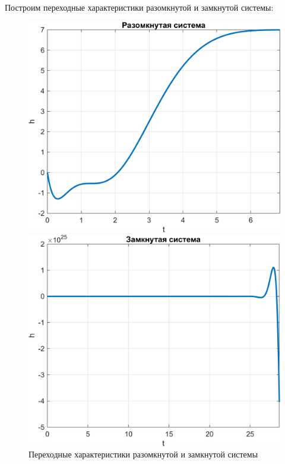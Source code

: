 Построим переходные характеристики разомкнутой и замкнутой системы:
\begin{figure}[H]
    \centering
    \begin{minipage}{0.45\textwidth}
        \centering
        \includegraphics[width=1\textwidth, trim={0cm 0cm 0cm 0cm}]{../images/1_2_h_ol.png}
    \end{minipage}
    \hfill
    \begin{minipage}{0.45\textwidth}
        \centering
        \includegraphics[width=1\textwidth, trim={0cm 0cm 0cm 0cm}]{../images/1_2_h_cl.png}
    \end{minipage}
    \caption{Переходные характеристики разомкнутой и замкнутой системы}
\end{figure}

